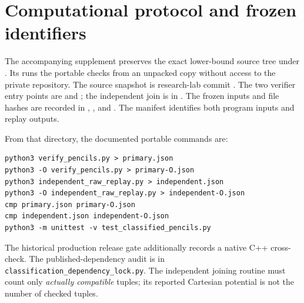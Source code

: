 \documentclass[11pt]{article}
\theoremstyle{definition}
\theoremstyle{remark}
\begin{document}
\section{Computational protocol and frozen identifiers}\label{app:reproduce}
The accompanying supplement preserves the exact lower-bound source tree
under .
Its  runs the portable checks from an unpacked
copy without access to the private repository.
The source snapshot is research-lab commit
.
The two verifier entry points are
 and ;
the independent join is in .
The frozen inputs and file hashes are recorded in
,
, and
.
The manifest identifies both program inputs and replay outputs.

From that directory, the documented portable commands are:
\begin{verbatim}
python3 verify_pencils.py > primary.json
python3 -O verify_pencils.py > primary-O.json
python3 independent_raw_replay.py > independent.json
python3 -O independent_raw_replay.py > independent-O.json
cmp primary.json primary-O.json
cmp independent.json independent-O.json
python3 -m unittest -v test_classified_pencils.py
\end{verbatim}
The historical production release gate additionally records a native
C++ cross-check. The published-dependency audit is in
\texttt{classification\_dependency\_lock.py}. The independent
joining routine must count only \emph{actually compatible} tuples;
its reported Cartesian potential is not the number of checked tuples.
\end{document}
